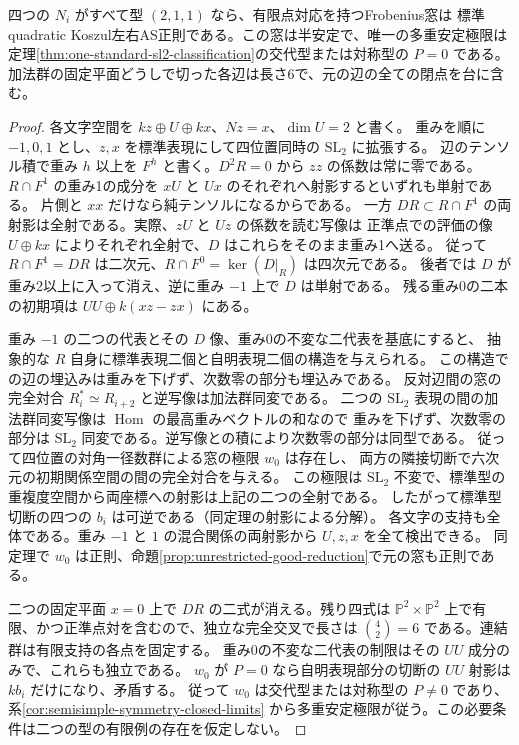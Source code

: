 \begin{theorem}\label{thm:finite-four-transvections}
四つの $N_i$ がすべて型 $(2,1,1)$ なら、有限点対応を持つFrobenius窓は
標準quadratic Koszul左右AS正則である。この窓は半安定で、唯一の多重安定極限は
定理\ref{thm:one-standard-sl2-classification}の交代型または対称型の $P=0$ である。
加法群の固定平面どうしで切った各辺は長さ6で、元の辺の全ての閉点を台に含む。
\end{theorem}
\begin{proof}
各文字空間を $kz\oplus U\oplus kx$、$Nz=x$、$\dim U=2$ と書く。
重みを順に $-1,0,1$ とし、$z,x$ を標準表現にして四位置同時の $\mathrm{SL}_2$ に拡張する。
辺のテンソル積で重み $h$ 以上を $F^h$ と書く。$D^2R=0$ から $zz$ の係数は常に零である。
$R\cap F^1$ の重み1の成分を $xU$ と $Ux$ のそれぞれへ射影するといずれも単射である。
片側と $xx$ だけなら純テンソルになるからである。
一方 $DR\subset R\cap F^1$ の両射影は全射である。実際、$zU$ と $Uz$ の係数を読む写像は
正準点での評価の像 $U\oplus kx$ によりそれぞれ全射で、$D$ はこれらをそのまま重み1へ送る。
従って $R\cap F^1=DR$ は二次元、$R\cap F^0=\ker(D|_R)$ は四次元である。
後者では $D$ が重み2以上に入って消え、逆に重み $-1$ 上で $D$ は単射である。
残る重み0の二本の初期項は $UU\oplus k(xz-zx)$ にある。

重み $-1$ の二つの代表とその $D$ 像、重み0の不変な二代表を基底にすると、
抽象的な $R$ 自身に標準表現二個と自明表現二個の構造を与えられる。
この構造での辺の埋込みは重みを下げず、次数零の部分も埋込みである。
反対辺間の窓の完全対合 $R_i^*\simeq R_{i+2}$ と逆写像は加法群同変である。
二つの $\mathrm{SL}_2$ 表現の間の加法群同変写像は $\operatorname{Hom}$ の最高重みベクトルの和なので
重みを下げず、次数零の部分は $\mathrm{SL}_2$ 同変である。逆写像との積により次数零の部分は同型である。
従って四位置の対角一径数群による窓の極限 $w_0$ は存在し、
両方の隣接切断で六次元の初期関係空間の間の完全対合を与える。
この極限は $\mathrm{SL}_2$ 不変で、標準型の重複度空間から両座標への射影は上記の二つの全射である。
したがって標準型切断の四つの $b_i$ は可逆である（同定理の射影による分解）。
各文字の支持も全体である。重み $-1$ と $1$ の混合関係の両射影から $U,z,x$ を全て検出できる。
同定理で $w_0$ は正則、命題\ref{prop:unrestricted-good-reduction}で元の窓も正則である。

二つの固定平面 $x=0$ 上で $DR$ の二式が消える。残り四式は
$\mathbb P^2\times\mathbb P^2$ 上で有限、かつ正準点対を含むので、独立な完全交叉で長さは
$\binom42=6$ である。連結群は有限支持の各点を固定する。
重み0の不変な二代表の制限はその $UU$ 成分のみで、これらも独立である。
$w_0$ が $P=0$ なら自明表現部分の切断の $UU$ 射影は $kb_i$ だけになり、矛盾する。
従って $w_0$ は交代型または対称型の $P\ne0$ であり、系\ref{cor:semisimple-symmetry-closed-limits}
から多重安定極限が従う。この必要条件は二つの型の有限例の存在を仮定しない。
\end{proof}
